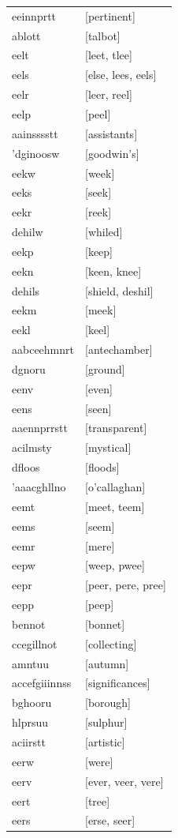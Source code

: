 \documentclass{article}
\begin{document}
\begin{tabular}{ll}
eeinnprtt & [pertinent] \\
ablott & [talbot] \\
eelt & [leet, tlee] \\
eels & [else, lees, eels] \\
eelr & [leer, reel] \\
eelp & [peel] \\
aainsssstt & [assistants] \\
'dginoosw & [goodwin's] \\
eekw & [week] \\
eeks & [seek] \\
eekr & [reek] \\
dehilw & [whiled] \\
eekp & [keep] \\
eekn & [keen, knee] \\
dehils & [shield, deshil] \\
eekm & [meek] \\
eekl & [keel] \\
aabceehmnrt & [antechamber] \\
dgnoru & [ground] \\
eenv & [even] \\
eens & [seen] \\
aaennprrstt & [transparent] \\
acilmsty & [mystical] \\
dfloos & [floods] \\
'aaacghllno & [o'callaghan] \\
eemt & [meet, teem] \\
eems & [seem] \\
eemr & [mere] \\
eepw & [weep, pwee] \\
eepr & [peer, pere, pree] \\
eepp & [peep] \\
bennot & [bonnet] \\
ccegillnot & [collecting] \\
amntuu & [autumn] \\
accefgiiinnss & [significances] \\
bghooru & [borough] \\
hlprsuu & [sulphur] \\
aciirstt & [artistic] \\
eerw & [were] \\
eerv & [ever, veer, vere] \\
eert & [tree] \\
eers & [erse, seer] \\

\end{tabular}
\end{document}
